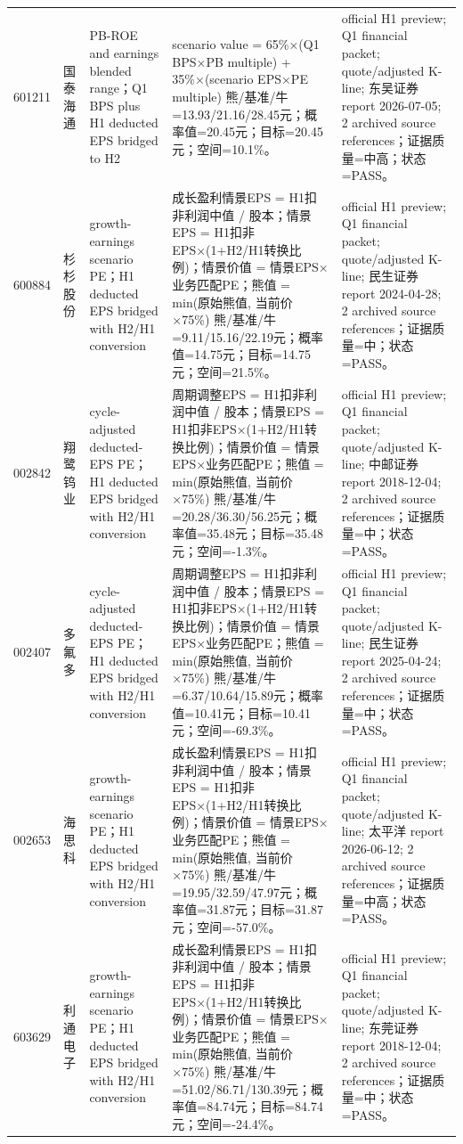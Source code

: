 \begin{longtable}{L{0.85cm}L{1.55cm}L{2.25cm}L{6.0cm}L{4.0cm}}
601211 & 国泰海通 & PB-ROE and earnings blended range；Q1 BPS plus H1 deducted EPS bridged to H2 & scenario value = 65\%×(Q1 BPS×PB multiple) + 35\%×(scenario EPS×PE multiple) 熊/基准/牛=13.93/21.16/28.45元；概率值=20.45元；目标=20.45元；空间=10.1\%。 & official H1 preview; Q1 financial packet; quote/adjusted K-line; 东吴证券 report 2026-07-05; 2 archived source references；证据质量=中高；状态=PASS。 \\
600884 & 杉杉股份 & growth-earnings scenario PE；H1 deducted EPS bridged with H2/H1 conversion & 成长盈利情景EPS = H1扣非利润中值 / 股本；情景EPS = H1扣非EPS×(1+H2/H1转换比例)；情景价值 = 情景EPS×业务匹配PE；熊值 = min(原始熊值, 当前价×75\%) 熊/基准/牛=9.11/15.16/22.19元；概率值=14.75元；目标=14.75元；空间=21.5\%。 & official H1 preview; Q1 financial packet; quote/adjusted K-line; 民生证券 report 2024-04-28; 2 archived source references；证据质量=中；状态=PASS。 \\
002842 & 翔鹭钨业 & cycle-adjusted deducted-EPS PE；H1 deducted EPS bridged with H2/H1 conversion & 周期调整EPS = H1扣非利润中值 / 股本；情景EPS = H1扣非EPS×(1+H2/H1转换比例)；情景价值 = 情景EPS×业务匹配PE；熊值 = min(原始熊值, 当前价×75\%) 熊/基准/牛=20.28/36.30/56.25元；概率值=35.48元；目标=35.48元；空间=-1.3\%。 & official H1 preview; Q1 financial packet; quote/adjusted K-line; 中邮证券 report 2018-12-04; 2 archived source references；证据质量=中；状态=PASS。 \\
002407 & 多氟多 & cycle-adjusted deducted-EPS PE；H1 deducted EPS bridged with H2/H1 conversion & 周期调整EPS = H1扣非利润中值 / 股本；情景EPS = H1扣非EPS×(1+H2/H1转换比例)；情景价值 = 情景EPS×业务匹配PE；熊值 = min(原始熊值, 当前价×75\%) 熊/基准/牛=6.37/10.64/15.89元；概率值=10.41元；目标=10.41元；空间=-69.3\%。 & official H1 preview; Q1 financial packet; quote/adjusted K-line; 民生证券 report 2025-04-24; 2 archived source references；证据质量=中；状态=PASS。 \\
002653 & 海思科 & growth-earnings scenario PE；H1 deducted EPS bridged with H2/H1 conversion & 成长盈利情景EPS = H1扣非利润中值 / 股本；情景EPS = H1扣非EPS×(1+H2/H1转换比例)；情景价值 = 情景EPS×业务匹配PE；熊值 = min(原始熊值, 当前价×75\%) 熊/基准/牛=19.95/32.59/47.97元；概率值=31.87元；目标=31.87元；空间=-57.0\%。 & official H1 preview; Q1 financial packet; quote/adjusted K-line; 太平洋 report 2026-06-12; 2 archived source references；证据质量=中高；状态=PASS。 \\
603629 & 利通电子 & growth-earnings scenario PE；H1 deducted EPS bridged with H2/H1 conversion & 成长盈利情景EPS = H1扣非利润中值 / 股本；情景EPS = H1扣非EPS×(1+H2/H1转换比例)；情景价值 = 情景EPS×业务匹配PE；熊值 = min(原始熊值, 当前价×75\%) 熊/基准/牛=51.02/86.71/130.39元；概率值=84.74元；目标=84.74元；空间=-24.4\%。 & official H1 preview; Q1 financial packet; quote/adjusted K-line; 东莞证券 report 2018-12-04; 2 archived source references；证据质量=中；状态=PASS。 \\

\end{longtable}
